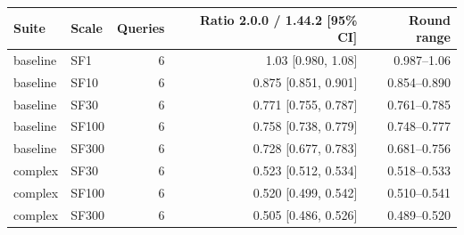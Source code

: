 \begin{tabular}{llrrr}
\toprule
Suite & Scale & Queries & Ratio 2.0.0 / 1.44.2 [95\% CI] & Round range \\
\midrule
baseline & SF1 & 6 & 1.03 [0.980, 1.08] & 0.987--1.06 \\
baseline & SF10 & 6 & 0.875 [0.851, 0.901] & 0.854--0.890 \\
baseline & SF30 & 6 & 0.771 [0.755, 0.787] & 0.761--0.785 \\
baseline & SF100 & 6 & 0.758 [0.738, 0.779] & 0.748--0.777 \\
baseline & SF300 & 6 & 0.728 [0.677, 0.783] & 0.681--0.756 \\
complex & SF30 & 6 & 0.523 [0.512, 0.534] & 0.518--0.533 \\
complex & SF100 & 6 & 0.520 [0.499, 0.542] & 0.510--0.541 \\
complex & SF300 & 6 & 0.505 [0.486, 0.526] & 0.489--0.520 \\
\bottomrule
\end{tabular}
